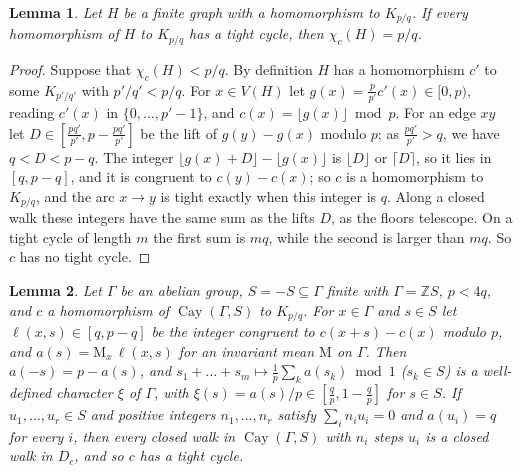 \documentclass[11pt,a4paper]{amsart}
\newtheorem{lemma}{Lemma}
\theoremstyle{remark}
\newcommand{\Z}{\mathbb{Z}}
\newcommand{\Cay}{\operatorname{Cay}}
\begin{document}
\begin{lemma}\label{lem:tight}
Let $H$ be a finite graph with a homomorphism to $K_{p/q}$. If every homomorphism of $H$ to $K_{p/q}$ has a tight
cycle, then $\chi_c(H)=p/q$.
\end{lemma}

\begin{proof}
Suppose that $\chi_c(H)<p/q$. By definition $H$ has a homomorphism $c'$ to some $K_{p'/q'}$ with $p'/q'<p/q$. For
$x\in V(H)$ let $g(x)=\frac p{p'}c'(x)\in[0,p)$, reading $c'(x)$ in $\{0,\dots,p'-1\}$, and $c(x)=\lfloor
g(x)\rfloor\bmod p$. For an edge $xy$ let $D\in[\frac{pq'}{p'},p-\frac{pq'}{p'}]$ be the lift of $g(y)-g(x)$ modulo
$p$; as $\frac{pq'}{p'}>q$, we have $q<D<p-q$. The integer $\lfloor g(x)+D\rfloor-\lfloor g(x)\rfloor$ is
$\lfloor D\rfloor$ or $\lceil D\rceil$, so it lies in $[q,p-q]$, and it is congruent to $c(y)-c(x)$; so $c$ is a
homomorphism to $K_{p/q}$, and the arc $x\to y$ is tight exactly when this integer is $q$. Along a closed walk these
integers have the same sum as the lifts $D$, as the floors telescope. On a tight cycle of length $m$ the first sum is
$mq$, while the second is larger than $mq$. So $c$ has no tight cycle.
\end{proof}

\begin{lemma}\label{lem:winding}
Let $\Gamma$ be an abelian group, $S=-S\subseteq\Gamma$ finite with $\Gamma=\Z S$, $p<4q$, and $c$ a homomorphism of
$\Cay(\Gamma,S)$ to $K_{p/q}$. For $x\in\Gamma$ and $s\in S$ let $\ell(x,s)\in[q,p-q]$ be the integer congruent to
$c(x+s)-c(x)$ modulo $p$, and $a(s)=\mathrm M_x\,\ell(x,s)$ for an invariant mean $\mathrm M$ on $\Gamma$. Then
$a(-s)=p-a(s)$, and $s_1+\dots+s_m\mapsto\frac1p\sum_ka(s_k)\bmod1$ \textup{(}$s_k\in S$\textup{)} is a well-defined
character $\xi$ of $\Gamma$, with $\xi(s)=a(s)/p\in[\frac qp,1-\frac qp]$ for $s\in S$. If $u_1,\dots,u_r\in S$ and
positive integers $n_1,\dots,n_r$ satisfy $\sum_in_iu_i=0$ and $a(u_i)=q$ for every $i$, then every closed walk in
$\Cay(\Gamma,S)$ with $n_i$ steps $u_i$ is a closed walk in $D_c$, and so $c$ has a tight cycle.
\end{lemma}
\end{document}
